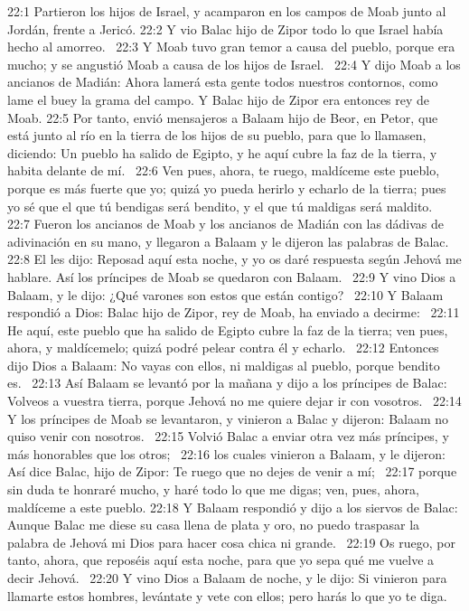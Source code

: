 22:1 Partieron los hijos de Israel, y acamparon en los campos de Moab junto al Jordán, frente a Jericó. 
22:2 Y vio Balac hijo de Zipor todo lo que Israel había hecho al amorreo.  
22:3 Y Moab tuvo gran temor a causa del pueblo, porque era mucho; y se angustió Moab a causa de los hijos de Israel.  
22:4 Y dijo Moab a los ancianos de Madián: Ahora lamerá esta gente todos nuestros contornos, como lame el buey la grama del campo. Y Balac hijo de Zipor era entonces rey de Moab. 
22:5 Por tanto, envió mensajeros a Balaam hijo de Beor, en Petor, que está junto al río en la tierra de los hijos de su pueblo, para que lo llamasen, diciendo: Un pueblo ha salido de Egipto, y he aquí cubre la faz de la tierra, y habita delante de mí.  
22:6 Ven pues, ahora, te ruego, maldíceme este pueblo, porque es más fuerte que yo; quizá yo pueda herirlo y echarlo de la tierra; pues yo sé que el que tú bendigas será bendito, y el que tú maldigas será maldito.  
22:7 Fueron los ancianos de Moab y los ancianos de Madián con las dádivas de adivinación en su mano, y llegaron a Balaam y le dijeron las palabras de Balac.  
22:8 El les dijo: Reposad aquí esta noche, y yo os daré respuesta según Jehová me hablare. Así los príncipes de Moab se quedaron con Balaam.  
22:9 Y vino Dios a Balaam, y le dijo: ¿Qué varones son estos que están contigo?  
22:10 Y Balaam respondió a Dios: Balac hijo de Zipor, rey de Moab, ha enviado a decirme:  
22:11 He aquí, este pueblo que ha salido de Egipto cubre la faz de la tierra; ven pues, ahora, y maldícemelo; quizá podré pelear contra él y echarlo.  
22:12 Entonces dijo Dios a Balaam: No vayas con ellos, ni maldigas al pueblo, porque bendito es.  
22:13 Así Balaam se levantó por la mañana y dijo a los príncipes de Balac: Volveos a vuestra tierra, porque Jehová no me quiere dejar ir con vosotros.  
22:14 Y los príncipes de Moab se levantaron, y vinieron a Balac y dijeron: Balaam no quiso venir con nosotros.  
22:15 Volvió Balac a enviar otra vez más príncipes, y más honorables que los otros;  
22:16 los cuales vinieron a Balaam, y le dijeron: Así dice Balac, hijo de Zipor: Te ruego que no dejes de venir a mí;  
22:17 porque sin duda te honraré mucho, y haré todo lo que me digas; ven, pues, ahora, maldíceme a este pueblo. 
22:18 Y Balaam respondió y dijo a los siervos de Balac: Aunque Balac me diese su casa llena de plata y oro, no puedo traspasar la palabra de Jehová mi Dios para hacer cosa chica ni grande.  
22:19 Os ruego, por tanto, ahora, que reposéis aquí esta noche, para que yo sepa qué me vuelve a decir Jehová.  
22:20 Y vino Dios a Balaam de noche, y le dijo: Si vinieron para llamarte estos hombres, levántate y vete con ellos; pero harás lo que yo te diga.  
